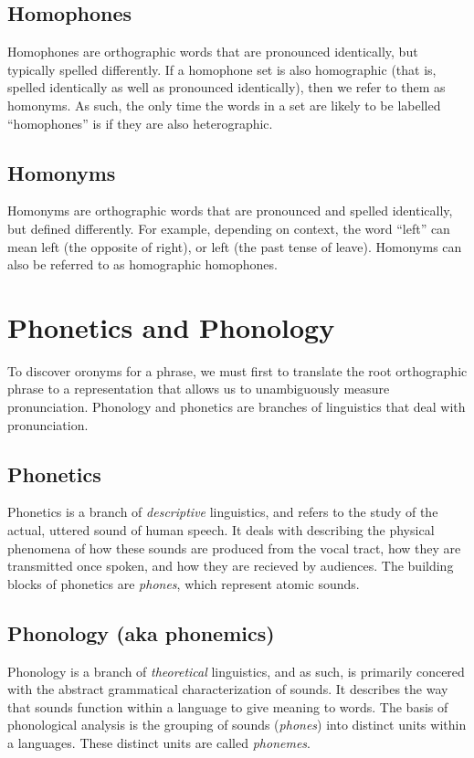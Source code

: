 \subsection{Homophones}
\label{section:Homophones}

Homophones are orthographic words that are pronounced identically, but typically spelled differently. If a homophone set is also homographic (that is, spelled identically as well as pronounced identically), then we refer to them as homonyms. As such, the only time the words in a set are likely to be labelled ``homophones'' is if they are also heterographic.

\subsection{Homonyms}
\label{section:Homonyms}

Homonyms are orthographic words that are pronounced and spelled identically, but defined differently. For example, depending on context, the word ``left'' can mean left (the opposite of right), or left (the past tense of leave). Homonyms can also be referred to as homographic homophones.


\section{Phonetics and Phonology}
\label{vocab:phoneticsAndPhonology}
To discover oronyms for a phrase, we must first to translate the root orthographic phrase to a representation that allows us to unambiguously measure pronunciation.   Phonology and phonetics are branches of linguistics that deal with pronunciation.

\subsection{Phonetics}
\label{vocab:phonetics}
Phonetics is a branch of \emph{descriptive} linguistics, and refers to the study of the actual, uttered sound of human speech. It deals with describing the physical phenomena of how these sounds are produced from the vocal tract, how they are transmitted once spoken, and how they are recieved by audiences. The building blocks of phonetics are \emph{phones}, which represent atomic sounds.

\subsection{Phonology (aka phonemics)}
\label{vocab:phonology}
Phonology is a branch of \emph{theoretical} linguistics, and as such, is primarily concered with the abstract grammatical characterization of sounds.  It describes the way that sounds function within a language to give meaning to words.  The basis of phonological analysis is the grouping of sounds (\emph{phones}) into distinct units within a languages.  These distinct units are called \emph{phonemes}.  


